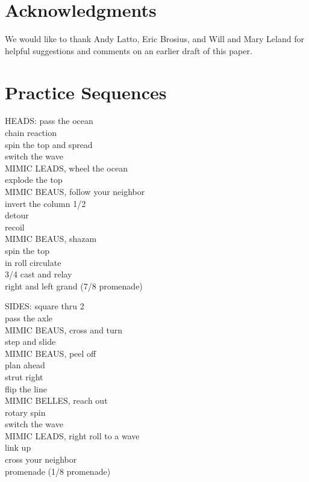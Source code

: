 \documentclass[12pt]{article}
\begin{document}
\section{Acknowledgments}

We would like to thank Andy Latto, Eric Brosius, and Will and Mary Leland
for helpful suggestions and comments on an earlier draft of this paper.

\newpage
\section*{Practice Sequences}
\bigskip\bigskip


HEADS: pass the ocean \\
chain reaction \\
spin the top and spread \\
switch the wave \\
MIMIC LEADS, wheel the ocean \\
explode the top \\
MIMIC BEAUS, follow your neighbor \\
invert the column 1/2 \\
detour \\
recoil \\
MIMIC BEAUS, shazam \\
spin the top \\
in roll circulate \\
3/4 cast and relay \\
right and left grand  (7/8 promenade)
\endsequence

\bigskip

SIDES: square thru 2\\
pass the axle\\
MIMIC BEAUS, cross and turn\\
step and slide\\
MIMIC BEAUS, peel off\\
plan ahead\\
strut right\\
flip the line\\
MIMIC BELLES, reach out\\
rotary spin\\
switch the wave\\
MIMIC LEADS, right roll to a wave\\
link up\\
cross your neighbor\\
promenade  (1/8 promenade)
\endsequence
\end{document}
